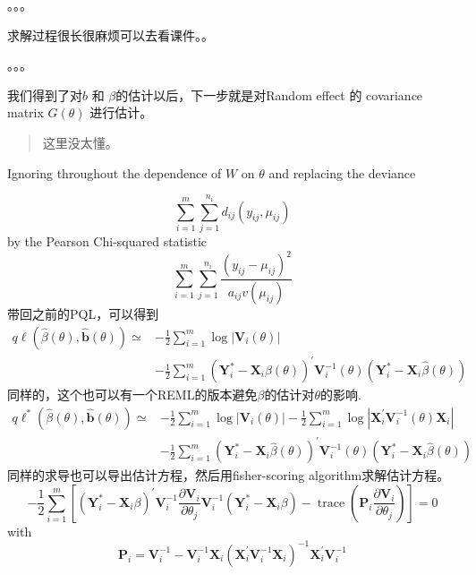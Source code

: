 \documentclass[
]{book}
\theoremstyle{definition}
\theoremstyle{definition}
\theoremstyle{definition}
\theoremstyle{remark}
\begin{document}
。。。

求解过程很长很麻烦可以去看课件。。

。。。

我们得到了对\(b\) 和 \(\beta\)的估计以后，下一步就是对Random effect 的 covariance matrix \(G(\theta)\) 进行估计。

\begin{quote}
这里没太懂。
\end{quote}

Ignoring throughout the dependence of \(W\) on \(\theta\) and replacing the deviance

\[
\sum_{i=1}^{m} \sum_{j=1}^{n_{i}} d_{i j}\left(y_{i j}, \mu_{i j}\right)
\]
by the Pearson Chi-squared statistic
\[
\sum_{i=1}^{m} \sum_{j=1}^{n_{i}} \frac{\left(y_{i j}-\mu_{i j}\right)^{2}}{a_{i j} v\left(\mu_{i j}\right)}
\]
带回之前的PQL，可以得到
\[
\begin{aligned} q \ell(\hat{\beta}(\theta), \hat{\mathbf{b}}(\theta)) \simeq &-\frac{1}{2} \sum_{i=1}^{m} \log \left|\mathbf{V}_{i}(\theta)\right| \\ &-\frac{1}{2} \sum_{i=1}^{m}\left(\mathbf{Y}_{i}^{*}-\mathbf{X}_{i} \hat{\beta}(\theta)\right)^{\prime} \mathbf{V}_{i}^{-1}(\theta)\left(\mathbf{Y}_{i}^{*}-\mathbf{X}_{i} \hat{\beta}(\theta)\right) \end{aligned}
\]
同样的，这个也可以有一个REML的版本避免\(\beta\)的估计对\(\theta\)的影响.
\[
\begin{aligned} q \ell^{*}(\hat{\beta}(\theta), \hat{\mathbf{b}}(\theta)) \simeq &-\frac{1}{2} \sum_{i=1}^{m} \log \left|\mathbf{V}_{i}(\theta)\right|-\frac{1}{2} \sum_{i=1}^{m} \log \left|\mathbf{X}_{i}^{\prime} \mathbf{V}_{i}^{-1}(\theta) \mathbf{X}_{i}\right| \\ &-\frac{1}{2} \sum_{i=1}^{m}\left(\mathbf{Y}_{i}^{*}-\mathbf{X}_{i} \hat{\beta}(\theta)\right)^{\prime} \mathbf{V}_{i}^{-1}(\theta)\left(\mathbf{Y}_{i}^{*}-\mathbf{X}_{i} \hat{\beta}(\theta)\right) \end{aligned}
\]
同样的求导也可以导出估计方程，然后用fisher-scoring algorithm求解估计方程。
\[
-\frac{1}{2} \sum_{i=1}^{m}\left[\left(\mathbf{Y}_{i}^{*}-\mathbf{X}_{i} \beta\right)^{\prime} \mathbf{V}_{i}^{-1} \frac{\partial \mathbf{V}_{i}}{\partial \theta_{j}} \mathbf{V}_{i}^{-1}\left(\mathbf{Y}_{i}^{*}-\mathbf{X}_{i} \beta\right)-\operatorname{trace}\left(\mathbf{P}_{i} \frac{\partial \mathbf{V}_{i}}{\partial \theta_{j}}\right)\right]=0
\]
with
\[
\mathbf{P}_{i}=\mathbf{V}_{i}^{-1}-\mathbf{V}_{i}^{-1} \mathbf{X}_{i}\left(\mathbf{X}_{i}^{\prime} \mathbf{V}_{i}^{-1} \mathbf{X}_{i}\right)^{-1} \mathbf{X}_{i}^{\prime} \mathbf{V}_{i}^{-1}
\]
\end{document}
